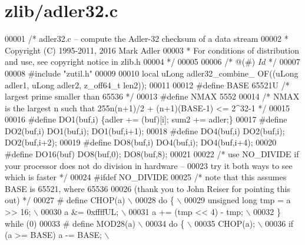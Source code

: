 \hypertarget{zlib_2adler32_8c_source}{}\section{zlib/adler32.c}
\label{zlib_2adler32_8c_source}

\begin{DoxyCode}
00001 \textcolor{comment}{/* adler32.c -- compute the Adler-32 checksum of a data stream}
00002 \textcolor{comment}{ * Copyright (C) 1995-2011, 2016 Mark Adler}
00003 \textcolor{comment}{ * For conditions of distribution and use, see copyright notice in zlib.h}
00004 \textcolor{comment}{ */}
00005 
00006 \textcolor{comment}{/* @(#) $Id$ */}
00007 
00008 \textcolor{preprocessor}{#include "zutil.h"}
00009 
00010 local uLong adler32\_combine\_ OF((uLong adler1, uLong adler2, z\_off64\_t len2));
00011 
00012 \textcolor{preprocessor}{#define BASE 65521U     }\textcolor{comment}{/* largest prime smaller than 65536 */}\textcolor{preprocessor}{}
00013 \textcolor{preprocessor}{#define NMAX 5552}
00014 \textcolor{comment}{/* NMAX is the largest n such that 255n(n+1)/2 + (n+1)(BASE-1) <= 2^32-1 */}
00015 
00016 \textcolor{preprocessor}{#define DO1(buf,i)  \{adler += (buf)[i]; sum2 += adler;\}}
00017 \textcolor{preprocessor}{#define DO2(buf,i)  DO1(buf,i); DO1(buf,i+1);}
00018 \textcolor{preprocessor}{#define DO4(buf,i)  DO2(buf,i); DO2(buf,i+2);}
00019 \textcolor{preprocessor}{#define DO8(buf,i)  DO4(buf,i); DO4(buf,i+4);}
00020 \textcolor{preprocessor}{#define DO16(buf)   DO8(buf,0); DO8(buf,8);}
00021 
00022 \textcolor{comment}{/* use NO\_DIVIDE if your processor does not do division in hardware --}
00023 \textcolor{comment}{   try it both ways to see which is faster */}
00024 \textcolor{preprocessor}{#ifdef NO\_DIVIDE}
00025 \textcolor{comment}{/* note that this assumes BASE is 65521, where 65536 %
00026 \textcolor{comment}{   (thank you to John Reiser for pointing this out) */}
00027 \textcolor{preprocessor}{#  define CHOP(a) \(\backslash\)}
00028 \textcolor{preprocessor}{    do \{ \(\backslash\)}
00029 \textcolor{preprocessor}{        unsigned long tmp = a >> 16; \(\backslash\)}
00030 \textcolor{preprocessor}{        a &= 0xffffUL; \(\backslash\)}
00031 \textcolor{preprocessor}{        a += (tmp << 4) - tmp; \(\backslash\)}
00032 \textcolor{preprocessor}{    \} while (0)}
00033 \textcolor{preprocessor}{#  define MOD28(a) \(\backslash\)}
00034 \textcolor{preprocessor}{    do \{ \(\backslash\)}
00035 \textcolor{preprocessor}{        CHOP(a); \(\backslash\)}
00036 \textcolor{preprocessor}{        if (a >= BASE) a -= BASE; \(\backslash\)}
}
\end{DoxyCode}
